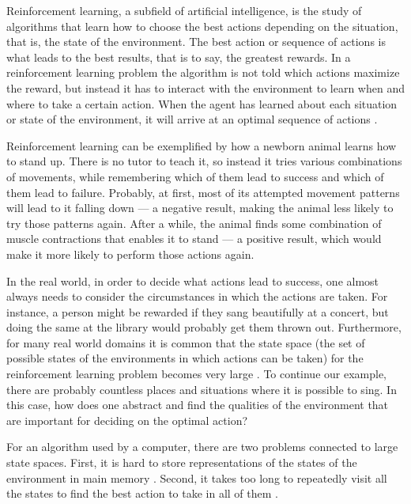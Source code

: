 Reinforcement learning, a subfield of artificial intelligence, is the study of algorithms that learn how to choose the best actions depending on the situation, that is, the state of the environment. The best action or sequence of actions is what leads to the best results, that is to say, the greatest rewards. In a reinforcement learning problem the algorithm is not told which actions maximize the reward, but instead it has to interact with the environment to learn when and where to take a certain action. When the agent has learned about each situation or state of the environment, it will arrive at an optimal sequence of actions \parencite{barto1998reinforcement}.


Reinforcement learning can be exemplified by how a newborn animal learns how to stand up. There is no tutor to teach it, so instead it tries various combinations of movements, while remembering which of them lead to success and which of them lead to failure. Probably, at first, most of its attempted movement patterns will lead to it falling down --- a negative result, making the animal less likely to try those patterns again. After a while, the animal finds some combination of muscle contractions that enables it to stand --- a positive result, which would make it more likely to perform those actions again. 

In the real world, in order to decide what actions lead to success, one almost always needs to consider the circumstances in which the actions are taken. For instance, a person might be rewarded if they sang beautifully at a concert, but doing the same at the library would probably get them thrown out. Furthermore, for many real world domains it is common that the state space (the set of possible states of the environments in which actions can be taken) for the reinforcement learning problem becomes very large \parencite{guestrin2003efficient}. To continue our example, there are probably countless places and situations where it is possible to sing. In this case, how does one abstract and find the qualities of the environment that are important for deciding on the optimal action? 

For an algorithm used by a computer, there are two problems connected to large state spaces. First, it is hard to store representations of the states of the environment in main memory \parencite{szepesvari2010algorithms}. Second, it takes too long to repeatedly visit all the states to find the best action to take in all of them \parencite{dietterich2013pac}.
